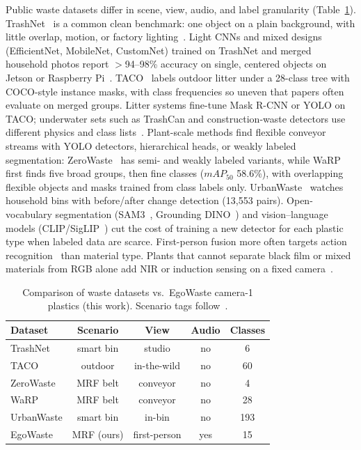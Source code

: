 \documentclass[conference]{IEEEtran}
\begin{document}
Public waste datasets differ in scene, view, audio, and label granularity (Table~\ref{tab:datasets}).
{TrashNet}~\cite{thung2016trashnet} is a common clean benchmark: one object on a plain background, with little overlap, motion, or factory lighting~\cite{tamin2026review}.
Light CNNs and mixed designs (EfficientNet, MobileNet, CustomNet) trained on TrashNet and merged household photos report $>$94--98\% accuracy on single, centered objects on Jetson or Raspberry Pi~\cite{thung2016trashnet,tamin2026review}.
{TACO}~\cite{proenca2020taco} labels outdoor litter under a 28-class tree with COCO-style instance masks, with class frequencies so uneven that papers often evaluate on merged groups.
Litter systems fine-tune Mask R-CNN or YOLO on TACO; underwater sets such as TrashCan and construction-waste detectors use different physics and class lists~\cite{proenca2020taco,tamin2026review}.
Plant-scale methods find flexible conveyor streams with YOLO detectors, hierarchical heads, or weakly labeled segmentation: ZeroWaste~\cite{bashkirova2022zerowaste} has semi- and weakly labeled variants, while WaRP~\cite{yudin2024warp} first finds five broad groups, then fine classes ($mAP_{50}$ 58.6\%), with overlapping flexible objects and masks trained from class labels only.
{UrbanWaste}~\cite{ma2025urbanwaste} watches household bins with before/after change detection (13{,}553 pairs).
Open-vocabulary segmentation (SAM3~\cite{carion2025sam3}, Grounding DINO~\cite{liu2023grounding}) and vision--language models (CLIP/SigLIP~\cite{radford2021learning,zhai2023siglip}) cut the cost of training a new detector for each plastic type when labeled data are scarce.
First-person fusion more often targets action recognition~\cite{grauman2022ego4d,radevski2023multimodal,alayrac2022flamingo} than material type.
Plants that cannot separate black film or mixed materials from RGB alone add NIR or induction sensing on a fixed camera~\cite{friedrich2022sensor,luo2024mdcf}.

\begin{table}[!t]
\caption{Comparison of waste datasets vs.\ EgoWaste camera-1 plastics (this work). Scenario tags follow~\cite{tamin2026review}.}
\label{tab:datasets}
\centering
\scriptsize
\setlength{\tabcolsep}{2pt}
\begin{tabular}{lcccc}
\toprule
Dataset & Scenario & View & Audio & Classes \\
\midrule
TrashNet & smart bin & studio & no & 6 \\
TACO & outdoor & in-the-wild & no & 60 \\
ZeroWaste & MRF belt & conveyor & no & 4 \\
WaRP & MRF belt & conveyor & no & 28 \\
UrbanWaste & smart bin & in-bin & no & 193 \\
EgoWaste & MRF (ours) & first-person & yes & 15 \\
\bottomrule
\end{tabular}
\end{table}
\end{document}
